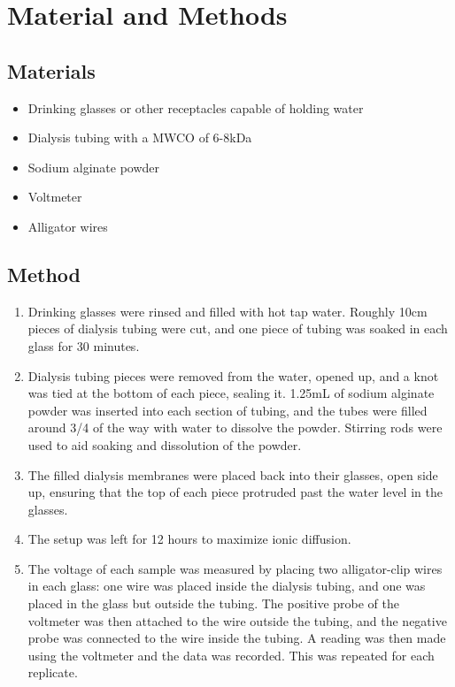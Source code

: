 \documentclass[letterpaper]{article}
\begin{document}
\section{Material and Methods}
\label{sec:matandmet}

\subsection*{Materials}

\begin{itemize}
	\item Drinking glasses or other receptacles capable of holding water
	\item Dialysis tubing with a MWCO of 6-8kDa
	\item Sodium alginate powder
	\item Voltmeter
	\item Alligator wires
\end{itemize}

\subsection*{Method}

\begin{enumerate}
	\item Drinking glasses were rinsed and filled with hot tap water. Roughly 10cm pieces of dialysis tubing were cut, and one piece of tubing was soaked in each glass for 30 minutes.
	\item Dialysis tubing pieces were removed from the water, opened up, and a knot was tied at the bottom of each piece, sealing it. 1.25mL of sodium alginate powder was inserted into each section of tubing, and the tubes were filled around 3/4 of the way with water to dissolve the powder. Stirring rods were used to aid soaking and dissolution of the powder.
	\item The filled dialysis membranes were placed back into their glasses, open side up, ensuring that the top of each piece protruded past the water level in the glasses.
	\item The setup was left for 12 hours to maximize ionic diffusion.
	\item The voltage of each sample was measured by placing two alligator-clip wires in each glass: one wire was placed inside the dialysis tubing, and one was placed in the glass but outside the tubing. The positive probe of the voltmeter was then attached to the wire outside the tubing, and the negative probe was connected to the wire inside the tubing. A reading was then made using the voltmeter and the data was recorded. This was repeated for each replicate.
\end{enumerate}
\end{document}
